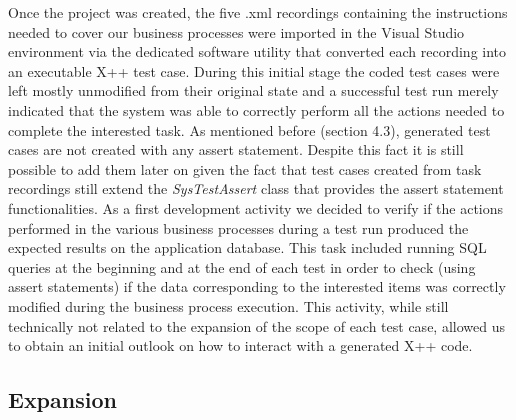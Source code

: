 Once the project was created, the five .xml recordings containing the instructions needed to cover our business processes were imported in the Visual Studio environment via the dedicated software utility that converted each recording into an executable X++ test case. During this initial stage the coded test cases were left mostly unmodified from their original state and a successful test run merely indicated that the system was able to correctly perform all the actions needed to complete the interested task. As mentioned before (section 4.3), generated test cases are not created with any assert statement. Despite this fact it is still possible to add them later on given the fact that test cases created from task recordings still extend the \textit{SysTestAssert} class that provides the assert statement functionalities. As a first development activity we decided to verify if the actions performed in the various business processes during a test run produced the expected results on the application database. This task included running SQL queries at the beginning and at the end of each test in order to check (using assert statements) if the data corresponding to the interested items was correctly modified during the business process execution. This activity, while still technically not related to the expansion of the scope of each test case, allowed us to obtain an initial outlook on how to interact with a generated X++ code.

\subsection{Expansion}

